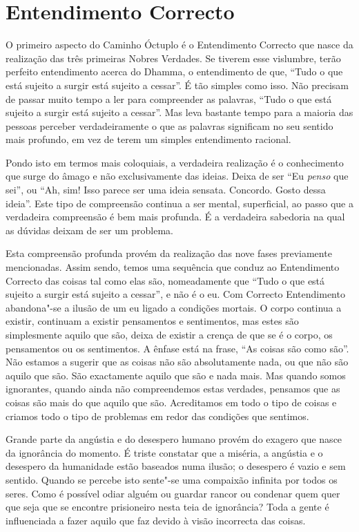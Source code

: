 \clearpage

\section{Entendimento Correcto}

O primeiro aspecto do Caminho Óctuplo é o Entendimento Correcto que nasce da
realização das três primeiras Nobres Verdades. Se tiverem esse vislumbre, terão
perfeito entendimento acerca do Dhamma, o entendimento de que, “Tudo o que está
sujeito a surgir está sujeito a cessar”. É tão simples como isso. Não precisam
de passar muito tempo a ler para compreender as palavras, “Tudo o que está
sujeito a surgir está sujeito a cessar”. Mas leva bastante tempo para a maioria
das pessoas perceber verdadeiramente o que as palavras significam no seu sentido
mais profundo, em vez de terem um simples entendimento racional.

Pondo isto em termos mais coloquiais, a verdadeira realização é o conhecimento
que surge do âmago e não exclusivamente das ideias. Deixa de ser “Eu
\emph{penso} que sei”, ou “Ah, sim! Isso parece ser uma ideia sensata. Concordo.
Gosto dessa ideia”. Este tipo de compreensão continua a ser mental,
superficial, ao passo que a verdadeira compreensão é bem mais profunda. É a
verdadeira sabedoria na qual as dúvidas deixam de ser um problema.

Esta compreensão profunda provém da realização das nove fases previamente
mencionadas. Assim sendo, temos uma sequência que conduz ao Entendimento
Correcto das coisas tal como elas são, nomeadamente que “Tudo o que está sujeito
a surgir está sujeito a cessar”, e não é o eu. Com Correcto Entendimento
abandona"-se a ilusão de um eu ligado a condições mortais. O corpo continua a
existir, continuam a existir pensamentos e sentimentos, mas estes são
simplesmente aquilo que são, deixa de existir a crença de que se é o corpo, os
pensamentos ou os sentimentos. A ênfase está na frase, “As coisas são como são”.
Não estamos a sugerir que as coisas não são absolutamente nada, ou que não são
aquilo que são. São exactamente aquilo que são e nada mais. Mas quando somos
ignorantes, quando ainda não compreendemos estas verdades, pensamos que as
coisas são mais do que aquilo que são. Acreditamos em todo o tipo de coisas e
criamos todo o tipo de problemas em redor das condições que sentimos.

Grande parte da angústia e do desespero humano provém do exagero que nasce da
ignorância do momento. É triste constatar que a miséria, a angústia e o
desespero da humanidade estão baseados numa ilusão; o desespero é vazio e sem
sentido. Quando se percebe isto sente"-se uma compaixão infinita por todos os
seres. Como é possível odiar alguém ou guardar rancor ou condenar quem quer que
seja que se encontre prisioneiro nesta teia de ignorância? Toda a gente é
influenciada a fazer aquilo que faz devido à visão incorrecta das coisas.

